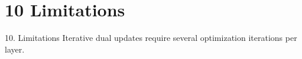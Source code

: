 \section{10 Limitations}

 10. Limitations
Iterative dual updates require several optimization iterations per layer.
